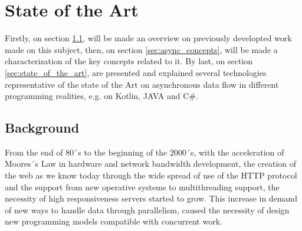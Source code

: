 % 
%  
%
\chapter{State of the Art}
\label{cha:users_manual}

Firstly, on section \ref{sec:related_work}, will be made an overview on previously developted work made on this subject, then, on section \ref{sec:async_concepts}, will be made a characterization of the key concepts related to it. By last, on section \ref{sec:state_of_the_art}, are presented and explained several technologies representative of the state of the Art on asynchronous data flow in different programming realities, e.g. on Kotlin, JAVA and C\#. 


\section{Background} %
\label{sec:related_work}


From the end of 80´s to the beginning of the 2000´s, with the acceleration of Moores´s Law in hardware and network bandwidth development, the creation of the web as we know today through the wide spread of use of the HTTP protocol and the support from new operative systems to multithreading support, the necessity of high responsiveness servers started to grow. This increase in demand of new ways to handle data through parallelism, caused the necessity of design new programming models compatible with concurrent work. 

